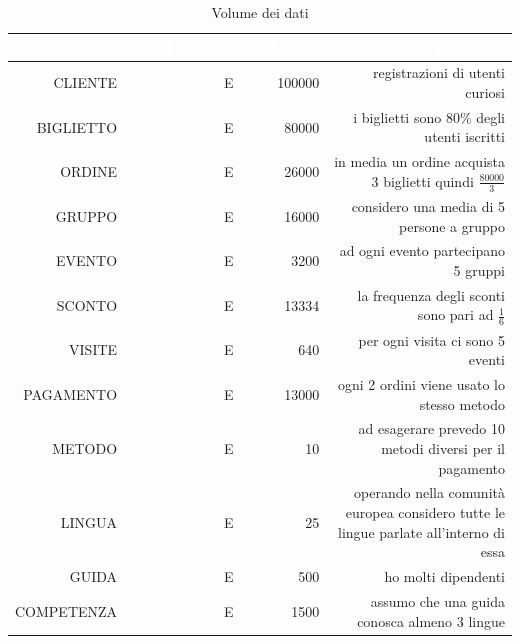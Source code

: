 \documentclass[a4paper,12pt]{report}
\begin{document}
\begin{xltabular}{\textwidth}{|D|D|D|D|}
	\caption{Volume dei dati} \label{tab:volumeDati}\\
	\hline
	 \textcolor{white}{\uppercase{concetto}} & \textcolor{white}{\uppercase{costrutto}} & \textcolor{white}{\uppercase{volume}} & \textcolor{white}{\uppercase{descrizione}} \\
	\hline
	\endhead
	\uppercase{cliente}                 & \uppercase{e}         & 100000             & registrazioni di utenti curiosi                                                       \\
	\hline
	\uppercase{biglietto}               & \uppercase{e}         & 80000              & i biglietti sono 80\% degli utenti iscritti                                           \\
	\hline
	\uppercase{ordine}                  & \uppercase{e}         & 26000              & in media un ordine acquista 3 biglietti quindi \(\frac{80000}{3}\)                                  \\
	\hline
	\uppercase{gruppo}                  & \uppercase{e}         & 16000              & considero una media di 5 persone a gruppo                                             \\
	\hline
	\uppercase{evento}                  & \uppercase{e}         & 3200               & ad ogni evento partecipano 5 gruppi                                                   \\
	\hline
	\uppercase{sconto}                  & \uppercase{e}         & 13334              & la frequenza degli sconti sono pari ad \(\frac16\)                                    \\
	\hline
	\uppercase{visite}                  & \uppercase{e}         & 640                & per ogni visita ci sono 5 eventi                                                      \\
	\hline
	\uppercase{pagamento}               & \uppercase{e}         & 13000              & ogni 2 ordini viene usato lo stesso metodo                                            \\
	\hline
	\uppercase{metodo}                  & \uppercase{e}         & 10                 & ad esagerare prevedo 10 metodi diversi per il pagamento                               \\
	\hline
	\uppercase{lingua}                  & \uppercase{e}         & 25                 & operando nella comunità europea considero tutte le lingue parlate all'interno di essa \\
	\hline
	\uppercase{guida}                  & \uppercase{e}         & 500                & ho molti dipendenti \\
	\hline
	\uppercase{competenza}             & \uppercase{e}         & 1500                & assumo che una guida conosca almeno 3 lingue \\
	\hline
\end{xltabular}
\end{document}
